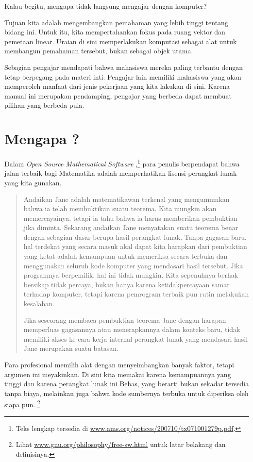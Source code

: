 Kalau begitu, mengapa tidak langsung mengajar dengan komputer?

Tujuan kita adalah mengembangkan pemahaman yang lebih tinggi tentang bidang
ini. Untuk itu, kita mempertahankan fokus pada ruang vektor dan pemetaan
linear. Uraian di sini memperlakukan komputasi sebagai alat untuk membangun
pemahaman tersebut, bukan sebagai objek utama.

Sebagian pengajar mendapati bahwa mahasiswa mereka paling terbantu dengan
tetap berpegang pada materi inti.
Pengajar lain memiliki mahasiswa yang akan memperoleh manfaat dari jenis
pekerjaan yang kita lakukan di sini.
Karena manual ini merupakan pendamping, pengajar yang berbeda dapat membuat
pilihan yang berbeda pula.


\section{Mengapa \Sage?}
Dalam
\textit{Open Source Mathematical Software}
\citep{JoynerStein07},\footnote{Teks lengkap tersedia di
\protect\url{www.ams.org/notices/200710/tx071001279p.pdf}.}
para penulis berpendapat bahwa jalan terbaik bagi Matematika adalah
memperhatikan lisensi perangkat lunak yang kita gunakan.

\begin{quotation}\small
Andaikan Jane adalah matematikawan terkenal yang mengumumkan bahwa ia telah
membuktikan suatu teorema. Kita mungkin akan memercayainya, tetapi ia tahu
bahwa ia harus memberikan pembuktian jika diminta. Sekarang andaikan Jane
menyatakan suatu teorema benar dengan sebagian dasar berupa hasil perangkat
lunak. Tanpa gagasan baru, hal terdekat yang secara masuk akal dapat kita
harapkan dari pembuktian yang ketat adalah kemampuan untuk memeriksa secara
terbuka dan menggunakan seluruh kode komputer yang mendasari hasil tersebut.
Jika programnya berpemilik, hal ini tidak mungkin. Kita sepenuhnya berhak
bersikap tidak percaya, bukan hanya karena ketidakpercayaan samar terhadap
komputer, tetapi karena pemrogram terbaik pun rutin melakukan kesalahan.

Jika seseorang membaca pembuktian teorema Jane dengan harapan memperluas
gagasannya atau menerapkannya dalam konteks baru, tidak memiliki akses ke
cara kerja internal perangkat lunak yang mendasari hasil Jane merupakan
suatu batasan.
\end{quotation}  
Para profesional memilih alat dengan menyeimbangkan banyak faktor, tetapi
argumen ini meyakinkan.
Di sini kita memakai \Sage{} karena kemampuannya yang tinggi dan karena
perangkat lunak ini Bebas, yang berarti bukan sekadar tersedia tanpa biaya,
melainkan juga bahwa kode sumbernya terbuka untuk diperiksa oleh siapa pun.
\footnote{Lihat \protect\url{www.gnu.org/philosophy/free-sw.html}
untuk latar belakang dan definisinya.}



